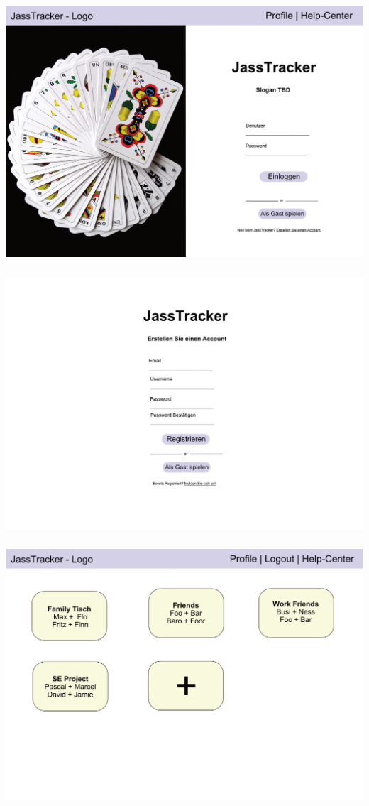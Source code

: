 \includegraphics[height=10cm, width=\textwidth]{resources/mockups/mockup-login.png}
\includegraphics[height=10cm, width=\textwidth]{resources/mockups/mockup-register.png}
\includegraphics[height=10cm, width=\textwidth]{resources/mockups/mockup-table-overview.png}

